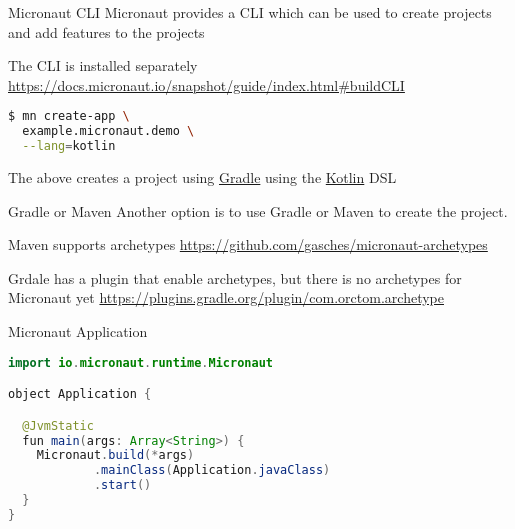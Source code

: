 \documentclass{beamer}
\begin{document}
\begin{frame}[t,fragile]{Micronaut CLI}
Micronaut provides a CLI which can be used to create projects and add features to the projects

The CLI is installed separately
{\footnotesize \href{https://docs.micronaut.io/snapshot/guide/index.html\#buildCLI}{https://docs.micronaut.io/snapshot/guide/index.html\#buildCLI}}

\vspace{16pt}
\begin{lstlisting}[language=bash, backgroundcolor = \color{green!5}]
$ mn create-app \
  example.micronaut.demo \
  --lang=kotlin
\end{lstlisting}

The above creates a project using \href{https://gradle.org/}{Gradle} using the \href{https://kotlinlang.org/}{Kotlin} DSL
\end{frame}


\begin{frame}[t]{Gradle or Maven}
Another option is to use Gradle or Maven to create the project.

\vspace{16pt}
Maven supports archetypes
{\footnotesize \href{https://github.com/gasches/micronaut-archetypes}{https://github.com/gasches/micronaut-archetypes}}

Grdale has a plugin that enable archetypes, but there is no archetypes for Micronaut yet
{\footnotesize \href{https://plugins.gradle.org/plugin/com.orctom.archetype}{https://plugins.gradle.org/plugin/com.orctom.archetype}}
\end{frame}


\begin{frame}[t,fragile]{Micronaut Application}
\vspace{16pt}
\begin{lstlisting}[language=java, backgroundcolor = \color{green!5}]
import io.micronaut.runtime.Micronaut

object Application {

  @JvmStatic
  fun main(args: Array<String>) {
    Micronaut.build(*args)
            .mainClass(Application.javaClass)
            .start()
  }
}
\end{lstlisting}
\end{frame}
\end{document}
